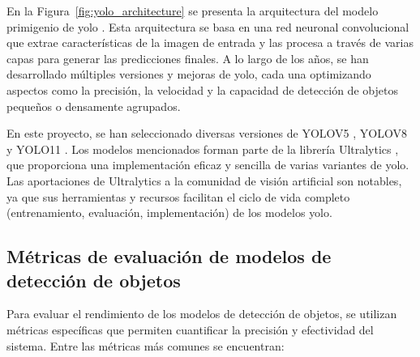 \documentclass[11pt,spanish,listoffigures,listoftables]{tfgetsinf}
\begin{document}
En la Figura~\ref{fig:yolo_architecture} se presenta la arquitectura del modelo primigenio de \gls{yolo} \cite{redmon2016lookonceunifiedrealtime}. Esta arquitectura se basa en una red neuronal convolucional que extrae características de la imagen de entrada y las procesa a través de varias capas para generar las predicciones finales. A lo largo de los años, se han desarrollado múltiples versiones y mejoras de \gls{yolo}, cada una optimizando aspectos como la precisión, la velocidad y la capacidad de detección de objetos pequeños o densamente agrupados.

En este proyecto, se han seleccionado diversas versiones de YOLOV5 \cite{yolov5_ultralytics}, YOLOV8 \cite{yolov8_ultralytics} y YOLO11 \cite{yolo11_ultralytics}. Los modelos mencionados forman parte de la librería Ultralytics \cite{Jocher_Ultralytics_YOLO_2023}, que proporciona una implementación eficaz y sencilla de varias variantes de \gls{yolo}. Las aportaciones de Ultralytics a la comunidad de visión artificial son notables, ya que sus herramientas y recursos facilitan el ciclo de vida completo (entrenamiento, evaluación, implementación) de los modelos \gls{yolo}.

\subsection{Métricas de evaluación de modelos de detección de objetos} \label{sec:metricas_evaluacion}

Para evaluar el rendimiento de los modelos de detección de objetos, se utilizan métricas específicas que permiten cuantificar la precisión y efectividad del sistema. Entre las métricas más comunes se encuentran:
\end{document}
